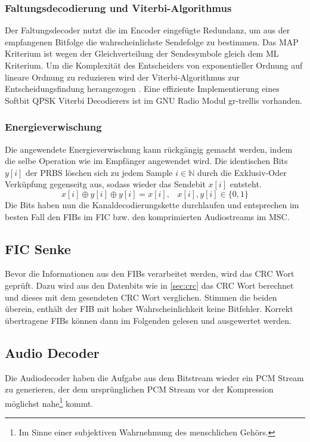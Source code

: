 \subsubsection{Faltungsdecodierung und Viterbi-Algorithmus}
Der Faltungsdecoder nutzt die im Encoder eingefügte Redundanz, um aus der empfangenen Bitfolge die wahrscheinlichste Sendefolge zu bestimmen. Das \ac{MAP} Kriterium ist wegen der Gleichverteilung der Sendesymbole gleich dem \ac{ML} Kriterium. Um die Komplexität des Entscheiders von exponentieller Ordnung auf lineare Ordnung zu reduzieren wird der Viterbi-Algorithmus zur Entscheidungsfindung herangezogen \cite{nt1}. Eine effiziente Implementierung eines Softbit QPSK Viterbi Decodierers ist im GNU Radio Modul gr-trellis vorhanden.

\subsubsection{Energieverwischung}
Die angewendete Energieverwischung kann rückgängig gemacht werden, indem die selbe Operation wie im Empfänger angewendet wird. Die identischen Bits $y[i]$ der \ac{PRBS} löschen sich zu jedem Sample $i \in \mathbb{N}$ durch die Exklusiv-Oder Verküpfung gegenseitg aus, sodass wieder das Sendebit $x[i]$ entsteht.
\begin{equation}
    x[i] \oplus y[i] \oplus y[i] = x[i], \; \; \; x[i],y[i] \in \{0,1\}
\end{equation}
Die Bits haben nun die Kanaldecodierungskette durchlaufen und entsprechen im besten Fall den FIBs im FIC bzw. den komprimierten Audiostreams im MSC.

\subsection{FIC Senke}
Bevor die Informationen aus den FIBs verarbeitet werden, wird das CRC Wort geprüft. Dazu wird aus den Datenbits wie in \ref{sec:crc} das CRC Wort berechnet und dieses mit dem gesendeten CRC Wort verglichen. Stimmen die beiden überein, enthält der FIB mit hoher Wahrscheinlichkeit keine Bitfehler. Korrekt übertragene FIBs können dann im Folgenden gelesen und ausgewertet werden.

\subsection{Audio Decoder}
Die Audiodecoder haben die Aufgabe aus dem Bitstream wieder ein PCM Stream zu generieren, der dem ursprünglichen PCM Stream vor der Kompression möglichst nahe\footnote{Im Sinne einer subjektiven Wahrnehmung des menschlichen Gehörs.} kommt.
